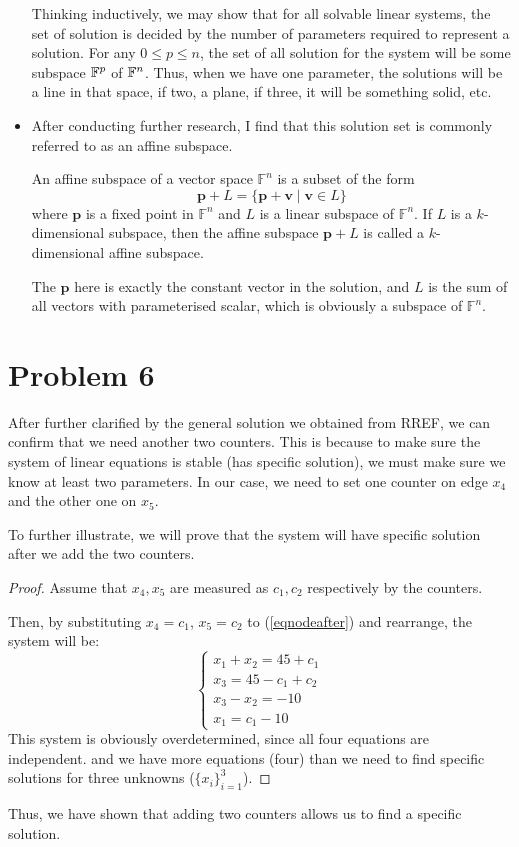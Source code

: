 \documentclass[12pt,a4paper]{article}
\begin{document}
\begin{solution}
\begin{remark}
\begin{itemize}
Thinking inductively, we may show that for all solvable linear systems, the set of solution is decided by the number of parameters required to represent a solution. For any $0 \leq p \leq n$, the set of all solution for the system will be some subspace $\mathbb{F}^p$ of $\mathbb{F}^n$. Thus, when we have one parameter, the solutions will be a line in that space, if two, a plane, if three, it will be something solid, etc.
\item After conducting further research, I find that this solution set is commonly referred to as an affine subspace. 
\begin{definition}
An affine subspace of a vector space \( \mathbb{F}^n \) is a subset of the form
\[
\mathbf{p} + L = \{ \mathbf{p} + \mathbf{v} \mid \mathbf{v} \in L \}
\]
where \( \mathbf{p} \) is a fixed point in \( \mathbb{F}^n \) and \( L \) is a linear subspace of \( \mathbb{F}^n \). If \( L \) is a \( k \)-dimensional subspace, then the affine subspace \( \mathbf{p} + L \) is called a \( k \)-dimensional affine subspace.
\end{definition}
The \( \mathbf{p} \) here is exactly the constant vector in the solution, and \( L \) is the sum of all vectors with parameterised scalar, which is obviously a subspace of \( \mathbb{F}^n \).
\end{itemize}

\end{remark}
\end{solution}

\section*{Problem 6}
\begin{solution}
After further clarified by the general solution we obtained from RREF, we can confirm that we need another two counters. This is because to make sure the system of linear equations is stable (has specific solution), we must make sure we know at least two parameters. In our case, we need to set one counter on edge $x_4$ and the other one on $x_5$.

To further illustrate, we will prove that the system will have specific solution after we add the two counters.
\begin{proof}
    Assume that $x_4, x_5$ are measured as $c_1,c_2$ respectively by the counters.
    
    Then, by substituting $x_4 = c_1$, $x_5=c_2$ to (\ref{eqnodeafter}) and rearrange, the system will be:
    \[
    \begin{cases}
        x_1+x_2 = 45+c_1\\
        x_3 = 45-c_1+c_2 \\
        x_3-x_2 = -10\\
        x_1=c_1-10
    \end{cases}
    \]
    This system is obviously overdetermined, since all four equations are independent. and we have more equations (four) than we need to find specific solutions for three unknowns ($\{x_i\}_{i=1}^3$).
\end{proof}
Thus, we have shown that adding two counters allows us to find a specific solution.
\end{solution}
\end{document}
